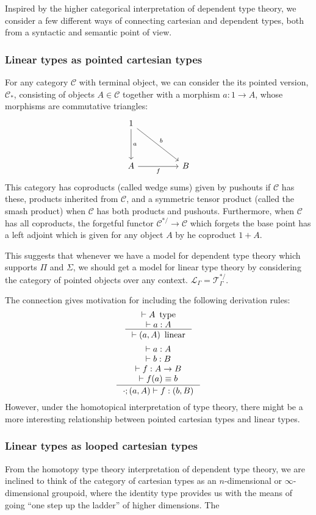 \documentclass[a4paper,english]{lipics-v2018}
\DeclareMathOperator{\type}{\text{ type}}
\DeclareMathOperator{\linear}{\text{ linear}}
\begin{document}
  Inspired by the higher categorical interpretation of dependent type theory, we consider a few different ways of connecting cartesian and dependent types, both from a syntactic and semantic point of view.
  \subsubsection{Linear types as pointed cartesian types}
  For any category $\mathcal{C}$ with terminal object, we can consider the its pointed version, $\mathcal{C}_*$, consisting of objects $A \in \mathcal{C}$ together with a morphism $a : 1 \to A$, whose morphisms are commutative triangles:
\[
  \begin{tikzcd}[row sep=huge, column sep=huge]
  1 \ar[d, "a"] \ar[dr, "b"] \\
  A \ar[r, "f",swap]& B
  \end{tikzcd}
\]
This category has coproducts (called wedge sums) given by pushouts if $\mathcal{C}$ has these, products inherited from $\mathcal{C}$, and a symmetric tensor product (called the smash product) when $\mathcal{C}$ has both products and pushouts. Furthermore, when $\mathcal{C}$ has all coproducts, the forgetful functor $\mathcal{C}^{*/} \to \mathcal{C}$ which forgets the base point has a left adjoint which is given for any object $A$ by he coproduct $1 + A$.

This suggests that whenever we have a model for dependent type theory which supports $\Pi$ and $\Sigma$, we should get a model for linear type theory by considering the category of pointed objects over any context. $\mathcal{L}_\Gamma = \mathcal{T}_\Gamma^{*/}$.

The connection gives motivation for including the following derivation rules:
  \[
  \inference{
    \vdash A \type\\
     \vdash a : A}
  {\vdash (a, A) \linear}
\]
\[
  \inference{
     \vdash a : A\\
     \vdash b : B\\
    \vdash f : A \to B\\
    \vdash f(a) \equiv b}
  {\cdot ; (a, A) \vdash f : (b, B)}
\]
However, under the homotopical interpretation of type theory, there might be a more interesting relationship between pointed cartesian types and linear types.
\subsubsection{Linear types as looped cartesian types}
From the homotopy type theory interpretation of dependent type theory, we are inclined to think of the category of cartesian types as an $n$-dimensional or $\infty$-dimensional groupoid, where the identity type provides us with the means of going ``one step up the ladder'' of higher dimensions. The 
\end{document}
